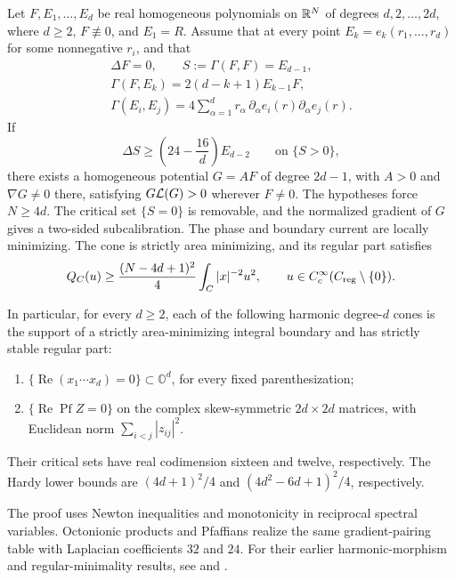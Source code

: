 \begin{maintheorem}
\label{main:spectral-criterion}\label{main:spectral-families}
Let $F,E_1,\ldots,E_d$ be real homogeneous polynomials on $\mathbb R^N$
of degrees $d,2,\ldots,2d$, where $d\ge2$, $F\not\equiv0$, and
$E_1=R$. Assume that at every point $E_k=e_k(r_1,\ldots,r_d)$ for
some nonnegative $r_i$, and that
\[
 \begin{gathered}
 \Delta F=0,\qquad S:=\Gamma(F,F)=E_{d-1},\\
 \Gamma(F,E_k)=2(d-k+1)E_{k-1}F,\\
 \Gamma(E_i,E_j)=4\sum_{\alpha=1}^d
       r_\alpha\,\partial_\alpha e_i(r)\partial_\alpha e_j(r).
 \end{gathered}
\]
If
\[
 \Delta S\ge\left(24-\frac{16}{d}\right)E_{d-2}
 \qquad\text{on }\{S>0\},
\]
there exists a homogeneous potential $G=AF$ of degree $2d-1$,
with $A>0$ and $\nabla G\ne0$ there, satisfying
$G\mathcal L(G)>0$ wherever $F\ne0$. The hypotheses force $N\ge4d$.
The critical set $\{S=0\}$ is removable, and the normalized gradient
of $G$ gives a two-sided subcalibration. The phase and boundary
current are locally minimizing. The cone is strictly area minimizing,
and its regular part satisfies
\[
 Q_C(u)\ge\frac{(N-4d+1)^2}{4}\int_C |x|^{-2}u^2,
 \qquad u\in C_c^\infty(C_{\mathrm{reg}}\setminus\{0\}).
\]

In particular, for every $d\ge2$, each of the following harmonic degree-$d$ cones
is the support of a strictly area-minimizing integral boundary
and has strictly stable regular part:
\begin{enumerate}[label=\textup{(\roman*)}]
\item $\{\operatorname{Re}(x_1\cdots x_d)=0\}\subset\mathbb O^d$,
for every fixed parenthesization;
\item $\{\operatorname{Re}\operatorname{Pf} Z=0\}$ on the complex
skew-symmetric $2d\times2d$ matrices, with Euclidean norm
$\sum_{i<j}|z_{ij}|^2$.
\end{enumerate}
Their critical sets have real codimension sixteen and twelve, respectively.
The Hardy lower bounds are $(4d+1)^2/4$ and
$(4d^2-6d+1)^2/4$, respectively.
\end{maintheorem}
The proof uses Newton inequalities and monotonicity in reciprocal
spectral variables. Octonionic products and Pfaffians realize the
same gradient-pairing table with Laplacian coefficients $32$ and $24$.
For their earlier harmonic-morphism and regular-minimality results, see
\cite[Section~4.5.2]{RiedlerThesis25} and
\cite[Corollary~5.2 and Remark~5.5]{HoppeTkachev19}.


